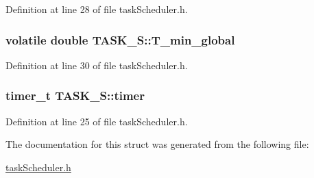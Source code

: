 Definition at line 28 of file task\-Scheduler.\-h.

\hypertarget{structTASK__S_a07174e333a0013f4d51b30509b388f58}{
\subsubsection[{T\-\_\-min\-\_\-global}]{\setlength{\rightskip}{0pt plus 5cm}volatile double T\-A\-S\-K\-\_\-\-S\-::\-T\-\_\-min\-\_\-global}}\label{structTASK__S_a07174e333a0013f4d51b30509b388f58}


Definition at line 30 of file task\-Scheduler.\-h.

\hypertarget{structTASK__S_a17834f3d4f84241ccb4191f3cf7d7af3}{
\subsubsection[{timer}]{\setlength{\rightskip}{0pt plus 5cm}timer\-\_\-t T\-A\-S\-K\-\_\-\-S\-::timer}}\label{structTASK__S_a17834f3d4f84241ccb4191f3cf7d7af3}


Definition at line 25 of file task\-Scheduler.\-h.



The documentation for this struct was generated from the following file\-:\begin{DoxyCompactItemize}
\item 
\hyperlink{taskScheduler_8h}{task\-Scheduler.\-h}\end{DoxyCompactItemize}
